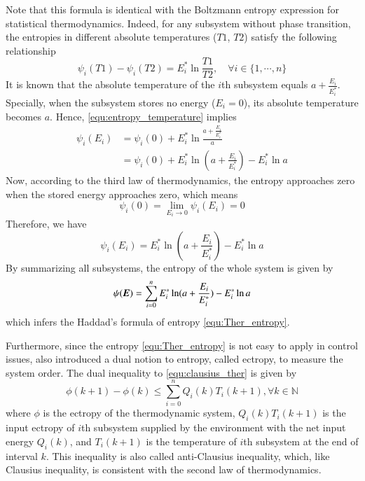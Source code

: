 \documentclass[preprint,authoryear,12pt]{elsarticle}
\renewcommand{\vec}[1]{\mbox{\boldmath$#1$}}
\begin{document}
Note that this formula is identical with the Boltzmann entropy
expression for statistical thermodynamics. Indeed, for any subsystem
without phase transition, the entropies in different absolute
temperatures ($T1$, $T2$) satisfy the following relationship
\citep{cengel_thermodynamics:_2001}
\begin{equation}\label{equ:entropy_temperature}
\psi_i(T1)-\psi_i(T2)=E_i^* \ln \frac{T1}{T2},\quad \forall
i\in\{1,\cdots,n\}
\end{equation}
It is known that the absolute temperature of the $i$th subsystem
equals $a+\frac{E_i}{E_i^*}$. Specially, when the subsystem stores no
energy ($E_i=0$), its absolute temperature becomes $a$. Hence,
\eqref{equ:entropy_temperature} implies
\begin{align}
\psi_i(E_i)&=\psi_i(0)+E_i^* \ln \frac{a+\frac{E_i}{E_i^*}}{a}
\nonumber\\
&=\psi_i(0)+E_i^* \ln (a+\frac{E_i}{E_i^*})-E_i^* \ln{a}
\label{equ:tmp_psi_1}
\end{align}
Now, according to the third law of thermodynamics, the entropy
approaches zero when the stored energy approaches zero, which means
\begin{equation}\label{equ:entropy_zero}
\psi_i(0)=\lim_{E_i\rightarrow 0}\psi_i(E_i)=0
\end{equation}
Therefore, we have
\begin{equation}
\psi_i(E_i)=E_i^* \ln (a+\frac{E_i}{E_i^*})-E_i^* \ln{a}
\end{equation}
By summarizing all subsystems, the entropy of the whole system is
given by
\begin{equation}
\psi(\vec{E})=\sum_{i=0}^n E_i^*\ln(a+\frac{E_i}{E_i^*})-E_i^*\ln a
\end{equation}
which infers the Haddad's formula of entropy
\eqref{equ:Ther_entropy}.

Furthermore, since the entropy \eqref{equ:Ther_entropy} is not easy
to apply in control issues, \citet{haddad_thermodynamic_2005} also
introduced a dual notion to entropy, called ectropy, to measure the
system order. The dual inequality to \eqref{equ:clausius_ther} is
given by
\begin{equation}\label{equ:anti_clausius}
\phi(k+1)-\phi(k)\le \sum_{i=0}^n Q_i(k)T_i(k+1),
\forall k\in\mathbb{N}
\end{equation}
where $\phi$ is the ectropy of the thermodynamic system,
$Q_i(k)T_i(k+1)$ is the input ectropy of $i$th subsystem supplied by
the environment with the net input energy $Q_i(k)$, and $T_i(k+1)$ is
the temperature of $i$th subsystem at the end of interval $k$. This
inequality is also called anti-Clausius inequality, which, like
Clausius inequality, is consistent with the second law of
thermodynamics.
\end{document}
